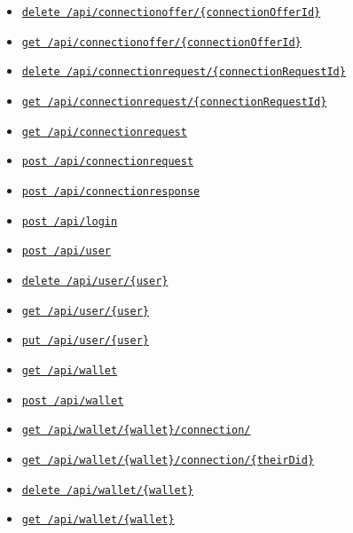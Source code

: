 \begin{itemize}
\tightlist
\item
  \protect\hyperlink{apiConnectionofferConnectionOfferIdDelete}{\texttt{delete\ /api/connectionoffer/\{connectionOfferId\}}}
\item
  \protect\hyperlink{apiConnectionofferConnectionOfferIdGet}{\texttt{get\ /api/connectionoffer/\{connectionOfferId\}}}
\item
  \protect\hyperlink{apiConnectionrequestConnectionRequestIdDelete}{\texttt{delete\ /api/connectionrequest/\{connectionRequestId\}}}
\item
  \protect\hyperlink{apiConnectionrequestConnectionRequestIdGet}{\texttt{get\ /api/connectionrequest/\{connectionRequestId\}}}
\item
  \protect\hyperlink{apiConnectionrequestGet}{\texttt{get\ /api/connectionrequest}}
\item
  \protect\hyperlink{apiConnectionrequestPost}{\texttt{post\ /api/connectionrequest}}
\item
  \protect\hyperlink{apiConnectionresponsePost}{\texttt{post\ /api/connectionresponse}}
\item
  \protect\hyperlink{apiLoginPost}{\texttt{post\ /api/login}}
\item
  \protect\hyperlink{apiUserPost}{\texttt{post\ /api/user}}
\item
  \protect\hyperlink{apiUserUserDelete}{\texttt{delete\ /api/user/\{user\}}}
\item
  \protect\hyperlink{apiUserUserGet}{\texttt{get\ /api/user/\{user\}}}
\item
  \protect\hyperlink{apiUserUserPut}{\texttt{put\ /api/user/\{user\}}}
\item
  \protect\hyperlink{apiWalletGet}{\texttt{get\ /api/wallet}}
\item
  \protect\hyperlink{apiWalletPost}{\texttt{post\ /api/wallet}}
\item
  \protect\hyperlink{apiWalletWalletConnectionGet}{\texttt{get\ /api/wallet/\{wallet\}/connection/}}
\item
  \protect\hyperlink{apiWalletWalletConnectionTheirDidGet}{\texttt{get\ /api/wallet/\{wallet\}/connection/\{theirDid\}}}
\item
  \protect\hyperlink{apiWalletWalletDelete}{\texttt{delete\ /api/wallet/\{wallet\}}}
\item
  \protect\hyperlink{apiWalletWalletGet}{\texttt{get\ /api/wallet/\{wallet\}}}
\end{itemize}

